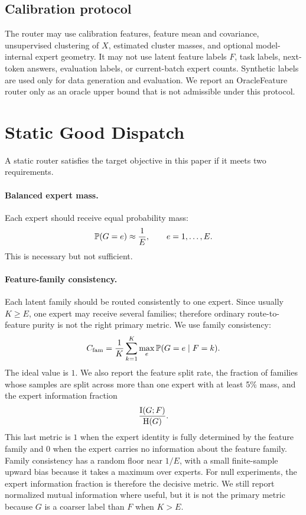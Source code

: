 \documentclass{article}
\begin{document}
\subsection{Calibration protocol}

The router may use calibration features, feature mean and covariance,
unsupervised clustering of \(X\), estimated cluster masses, and optional
model-internal expert geometry.  It may not use latent feature labels \(F\), task
labels, next-token answers, evaluation labels, or current-batch expert counts.
Synthetic labels are used only for data generation and evaluation.  We report an
OracleFeature router only as an oracle upper bound that is not admissible under
this protocol.

\section{Static Good Dispatch}

A static router satisfies the target objective in this paper if it meets two
requirements.

\paragraph{Balanced expert mass.}
Each expert should receive equal probability mass:
\begin{equation}
    \mathbb{P}(G=e)\approx\frac1E,\qquad e=1,\ldots,E.
    \label{eq:mass}
\end{equation}
This is necessary but not sufficient.

\paragraph{Feature-family consistency.}
Each latent family should be routed consistently to one expert.  Since usually
\(K\geq E\), one expert may receive several families; therefore ordinary
route-to-feature purity is not the right primary metric.  We use family
consistency:
\begin{equation}
    C_{\mathrm{fam}}
    =
    \frac1K\sum_{k=1}^K \max_e \mathbb{P}(G=e\mid F=k).
    \label{eq:family_consistency}
\end{equation}
The ideal value is \(1\).  We also report the feature split rate, the fraction of
families whose samples are split across more than one expert with at least 5\%
mass, and the expert information fraction
\begin{equation}
    \frac{\mathrm{I}(G;F)}{\mathrm{H}(G)}.
    \label{eq:info_fraction}
\end{equation}
This last metric is \(1\) when the expert identity is fully determined by the
feature family and \(0\) when the expert carries no information about the feature
family.  Family consistency has a random floor near \(1/E\), with a small
finite-sample upward bias because it takes a maximum over experts.  For null
experiments, the expert information fraction is therefore the decisive metric.
We still report normalized mutual information where useful, but it is not the
primary metric because \(G\) is a coarser label than \(F\) when \(K>E\).
\end{document}
